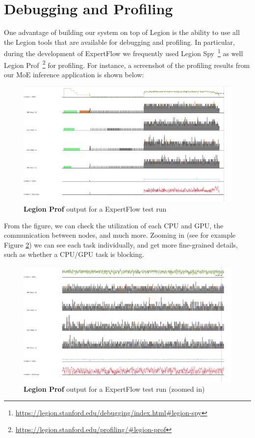 \section{Debugging and Profiling}
One advantage of building our system on top of Legion is the ability to use all the Legion tools that are available for debugging and profiling. In particular, during the development of ExpertFlow we frequently used Legion Spy~\footnote{\url{https://legion.stanford.edu/debugging/index.html\#legion-spy}} as well Legion Prof~\footnote{\url{https://legion.stanford.edu/profiling/\#legion-prof}} for profiling. For instance, a screenshot of the profiling results from our MoE inference application is shown below:
\begin{figure}[H]
    \centering
    \includegraphics[width=\linewidth]{figures/legion_prof0.png}
    \caption{\textbf{Legion Prof} output for a ExpertFlow test run}
    \label{fig:legion-prof0}
\end{figure}
From the figure, we can check the utilization of each CPU and GPU, the communication between nodes, and much more. Zooming in (see for example Figure \ref{fig:legion-prof1}) we can see each task individually, and get more fine-grained details, such as whether a CPU/GPU task is blocking.
\begin{figure}[H]
    \centering
    \includegraphics[width=\linewidth]{figures/legion_prof1.png}
    \caption{\textbf{Legion Prof} output for a ExpertFlow test run (zoomed in)}
    \label{fig:legion-prof1}
\end{figure}

